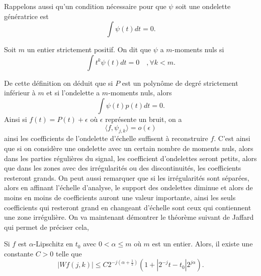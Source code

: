 Rappelons aussi qu'un condition nécessaire pour que $\psi$ soit une ondelette génératrice est
\begin{equation*}
	\int \psi (t)dt = 0.
\end{equation*}
\begin{definition}
	Soit $m$ un entier strictement positif.
	On dit que $\psi$ a $m$-moments nuls si
	\begin{equation*}
		\int t^k \psi(t)dt = 0 \quad, \forall k < m.
	\end{equation*}
\end{definition}
De cette définition on déduit que si $P$ est un polynôme de degré strictement inférieur à $m$ et si l'ondelette a $m$-moments nuls, alors
\begin{equation}\label{eq:momPol}
	\int \psi(t) p(t) dt = 0.
\end{equation}
Ainsi si $f(t) = P(t) +\epsilon$ où $\epsilon$ représente un bruit, on a 
\begin{equation*}
	\langle f, \psi_{j,k} \rangle = o(\epsilon)
\end{equation*}
ainsi les coefficients de l'ondelette d'échelle suffisent à reconstruire $f$.
C'est ainsi que si on considère une ondelette avec un certain nombre de moments nuls, alors dans les parties régulières du signal, les coefficient d'ondelettes seront petits, alors que dans les zones avec des irrégularités ou des discontinuités, les coefficients resteront grands.
On peut aussi remarquer que si les irrégularités sont séparées, alors en affinant l'échelle d'analyse, le support des ondelettes diminue et alors de moins en moins de coefficients auront une valeur importante, ainsi les seuls coefficients qui resteront grand en changeant d'échelle sont ceux qui contiennent une zone irrégulière. 
\newline
On va maintenant démontrer le théorème suivant de Jaffard qui permet de préciser cela,
\begin{theoreme}\label{th:Jaffard}
	Si $f$ est $\alpha$-Lipschitz en $t_0$ avec $0 < \alpha \leq m$ où $m$ est un entier.
	Alors, il existe une constante $C >0$ telle que 
	\begin{equation*}
		|Wf(j, k)| \leq C2^{-j(\alpha + \frac{1}{2})}(1 + |2^{-j}t - t_0|2^{j\alpha}).
	\end{equation*}
\end{theoreme}
